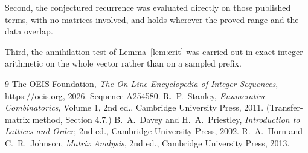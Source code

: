 \documentclass[11pt,a4paper]{article}
\theoremstyle{plain}
\theoremstyle{definition}
\begin{document}
Second, the conjectured recurrence was evaluated directly on those published terms, with no
matrices involved, and holds wherever the proved range and the data overlap.

Third, the annihilation test of Lemma~\ref{lem:crit} was carried out in exact integer
arithmetic on the whole vector rather than on a sampled prefix.

\begin{thebibliography}{9}
 The OEIS Foundation, \emph{The On-Line Encyclopedia of Integer
Sequences}, \url{https://oeis.org}, 2026. Sequence A254580.
 R.~P.~Stanley, \emph{Enumerative Combinatorics}, Volume 1, 2nd ed.,
Cambridge University Press, 2011. (Transfer-matrix method, Section 4.7.)
 B.~A.~Davey and H.~A.~Priestley, \emph{Introduction to Lattices and
Order}, 2nd ed., Cambridge University Press, 2002.
 R.~A.~Horn and C.~R.~Johnson, \emph{Matrix Analysis}, 2nd ed., Cambridge
University Press, 2013.
\end{thebibliography}
\end{document}

